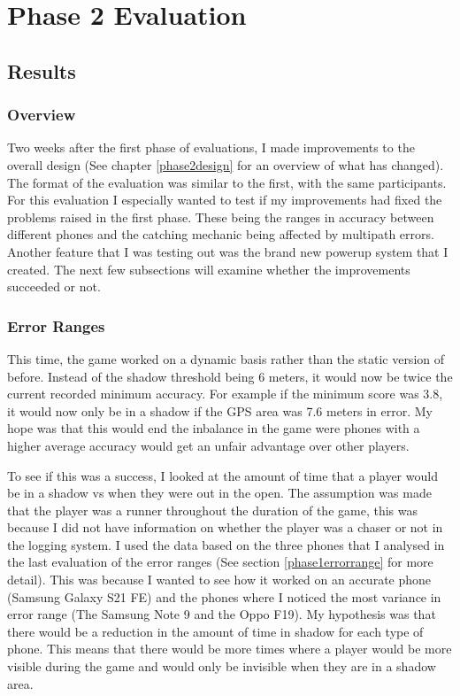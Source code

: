 \documentclass{l4proj}
\begin{document}
\chapter{Phase 2 Evaluation}

\section{Results}
\subsection{Overview}
Two weeks after the first phase of evaluations, I made improvements to the overall design (See chapter \ref{phase2design} for an overview
of what has changed). The format of the evaluation was similar to the first, with the same participants. For this evaluation I especially
wanted to test if my improvements had fixed the problems raised in the first phase. These being the ranges in accuracy between different
phones and the catching mechanic being affected by multipath errors. Another feature that I was testing out was the brand new powerup
system that I created. The next few subsections will examine whether the improvements succeeded or not.

\subsection{Error Ranges}
This time, the game worked on a dynamic basis rather than the static version of before. Instead of the shadow threshold being
6 meters, it would now be twice the current recorded minimum accuracy. For example if the minimum score was 3.8, it would now
only be in a shadow if the GPS area was 7.6 meters in error. My hope was that this would end the inbalance in the game were
phones with a higher average accuracy would get an unfair advantage over other players.

To see if this was a success, I looked at the amount of time that a player would be in a shadow vs when they were out in the
open. The assumption was made that the player was a runner throughout the duration of the game, this was because I did not have
information on whether the player was a chaser or not in the logging system. I used the data based on the three phones that I 
analysed in the last evaluation of the error ranges (See section \ref{phase1errorrange} for more detail). This was because I wanted
to see how it worked on an accurate phone (Samsung Galaxy S21 FE) and the phones where I noticed the most variance in error range (The Samsung Note 9 and the Oppo F19).
My hypothesis was that there would be a reduction in the amount of time in shadow for each type of phone. This means that there would be
more times where a player would be more visible during the game and would only be invisible when they are in a shadow area.
\end{document}
